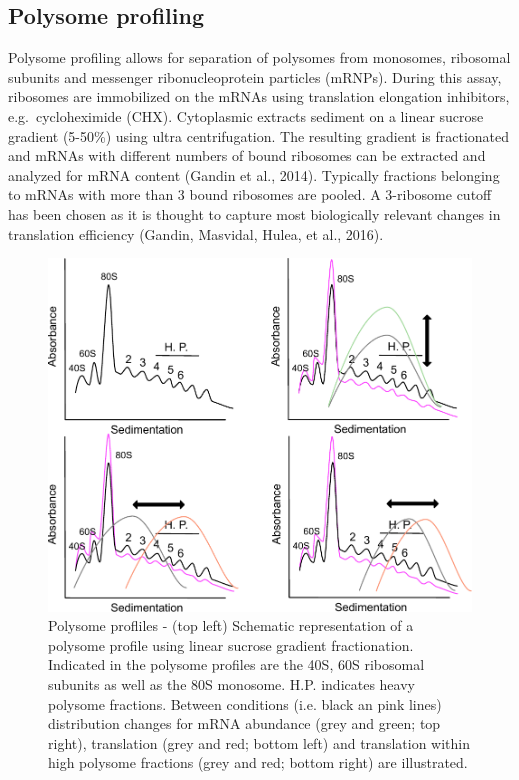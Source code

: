 \documentclass[
  12pt,
  openany]{book}
\begin{document}
\subsection{Polysome profiling}

Polysome profiling allows for separation of polysomes from monosomes, ribosomal subunits and messenger ribonucleoprotein particles (mRNPs). During this assay, ribosomes are immobilized on the mRNAs using translation elongation inhibitors, e.g.~cycloheximide (CHX). Cytoplasmic extracts sediment on a linear sucrose gradient (5-50\%) using ultra centrifugation. The resulting gradient is fractionated and mRNAs with different numbers of bound ribosomes can be extracted and analyzed for mRNA content (Gandin et al., 2014). Typically fractions belonging to mRNAs with more than 3 bound ribosomes are pooled. A 3-ribosome cutoff has been chosen as it is thought to capture most biologically relevant changes in translation efficiency (Gandin, Masvidal, Hulea, et al., 2016).

\begin{figure}
    \includegraphics[width=0.9\linewidth]{./figures/polysome_shifts.pdf}
  \caption{Polysome profliles -  (top left) Schematic representation of a polysome profile using linear sucrose gradient fractionation. Indicated in the polysome profiles are the 40S, 60S ribosomal subunits as well as the 80S monosome. H.P. indicates heavy polysome fractions. Between conditions (i.e. black an pink lines) distribution changes for mRNA abundance (grey and green; top right), translation (grey and red; bottom left) and translation within high polysome fractions (grey and red; bottom right) are illustrated. \label{fig:polysome}}
\end{figure}
\end{document}
